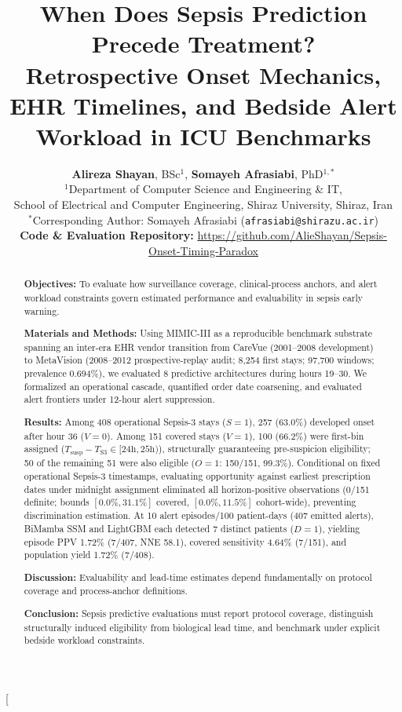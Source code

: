 \documentclass[10pt,twocolumn,a4paper]{article}
\title{\vspace{-1.2em}\textbf{\Large When Does Sepsis Prediction Precede Treatment?\\ Retrospective Onset Mechanics, EHR Timelines, and Bedside Alert Workload in ICU Benchmarks}}
\author{
    \textbf{Alireza Shayan}, BSc$^{1}$, \quad \textbf{Somayeh Afrasiabi}, PhD$^{1,*}$ \\[0.4em]
    $^{1}$Department of Computer Science and Engineering \& IT,\\
    School of Electrical and Computer Engineering, Shiraz University, Shiraz, Iran \\[0.3em]
    $^{*}$Corresponding Author: Somayeh Afrasiabi (\texttt{afrasiabi@shirazu.ac.ir}) \\[0.25em]
    {\small \textbf{Code \& Evaluation Repository:} \url{https://github.com/AlieShayan/Sepsis-Onset-Timing-Paradox}}
}
\date{}
\begin{document}
\twocolumn[{%
\begin{@twocolumnfalse}
\maketitle

\begin{abstract}
\noindent\textbf{Objectives:} To evaluate how surveillance coverage, clinical-process anchors, and alert workload constraints govern estimated performance and evaluability in sepsis early warning.

\vspace{0.25em}
\noindent\textbf{Materials and Methods:} Using MIMIC-III as a reproducible benchmark substrate spanning an inter-era EHR vendor transition from CareVue (2001--2008 development) to MetaVision (2008--2012 prospective-replay audit; 8,254 first stays; 97,700 windows; prevalence 0.694\%), we evaluated 8 predictive architectures during hours 19--30. We formalized an operational cascade, quantified order date coarsening, and evaluated alert frontiers under 12-hour alert suppression.

\vspace{0.25em}
\noindent\textbf{Results:} Among 408 operational Sepsis-3 stays ($S=1$), 257 (63.0\%) developed onset after hour 36 ($V=0$). Among 151 covered stays ($V=1$), 100 (66.2\%) were first-bin assigned ($T_{\mathrm{susp}} - T_{\mathrm{S3}} \in [24\mathrm{h}, 25\mathrm{h})$), structurally guaranteeing pre-suspicion eligibility; 50 of the remaining 51 were also eligible ($O=1$: 150/151, 99.3\%). Conditional on fixed operational Sepsis-3 timestamps, evaluating opportunity against earliest prescription dates under midnight assignment eliminated all horizon-positive observations (0/151 definite; bounds $[0.0\%, 31.1\%]$ covered, $[0.0\%, 11.5\%]$ cohort-wide), preventing discrimination estimation. At 10 alert episodes/100 patient-days (407 emitted alerts), BiMamba SSM and LightGBM each detected 7 distinct patients ($D=1$), yielding episode PPV 1.72\% (7/407, NNE 58.1), covered sensitivity 4.64\% (7/151), and population yield 1.72\% (7/408).

\vspace{0.25em}
\noindent\textbf{Discussion:} Evaluability and lead-time estimates depend fundamentally on protocol coverage and process-anchor definitions.

\vspace{0.25em}
\noindent\textbf{Conclusion:} Sepsis predictive evaluations must report protocol coverage, distinguish structurally induced eligibility from biological lead time, and benchmark under explicit bedside workload constraints.


\end{abstract}
\end{@twocolumnfalse}}
\end{document}
